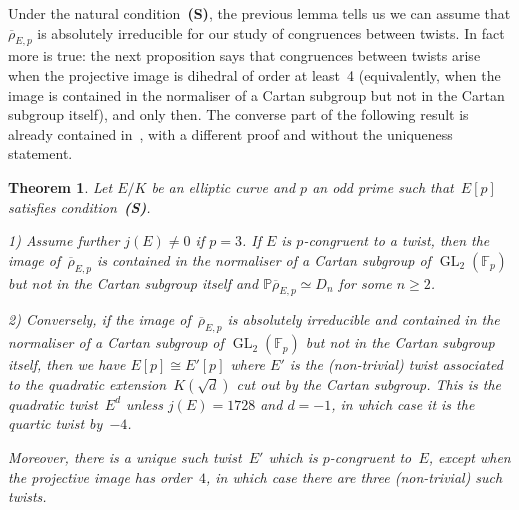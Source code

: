 \documentclass[12pt, reqno]{amsart}
\newcommand{\Fp}{\mathbb{F}_p}
\newcommand{\PP}{\mathbb{P}}
\newcommand{\rhobar}{{\overline{\rho}}}
\newcommand{\GL}{\operatorname{GL}}
\numberwithin{equation}{section}
\newtheorem{theorem}{Theorem}[section]
\theoremstyle{definition}
\theoremstyle{remark}
\newcommand{\condS}{condition~{\bf (S)}}
\begin{document}
Under the natural \condS, the previous lemma tells us we can assume
that $\rhobar_{E,p}$ is absolutely irreducible for our study of
congruences between twists. In fact more is true: the next proposition
says that congruences between twists arise when the projective image
is dihedral of order at least~4 (equivalently, when the image is
contained in the normaliser of a Cartan subgroup but not in the Cartan subgroup
itself), and only then.  The converse part of the following result is
already contained in~\cite[\S2]{Halberstadt-11nonsplit}, with a
different proof and without the uniqueness statement.

\begin{theorem}\label{T:twist}
Let $E/K$ be an elliptic curve and $p$ an odd prime such that~$E[p]$
satisfies \condS. 


1) Assume further $j(E) \neq 0$ if $p=3$. If $E$ is $p$-congruent to a twist, 
then the image of~$\rhobar_{E,p}$ is contained in the normaliser of a
Cartan subgroup of $\GL_2(\Fp)$ but not in the Cartan subgroup itself and
$\PP \rhobar_{E,p} \simeq D_n$ for some $n \geq 2$.

2) Conversely, if the image of~$\rhobar_{E,p}$ is absolutely irreducible and contained in the
normaliser of a Cartan subgroup of $\GL_2(\Fp)$ but not in the Cartan
subgroup itself, 
then we have $E[p]\cong E'[p]$ where $E'$ is the (non-trivial) twist associated to
the quadratic extension~$K(\sqrt{d})$ cut out by the Cartan subgroup.
This is the quadratic twist~$E^d$ unless $j(E)=1728$ and $d=-1$, in
which case it is the quartic twist by~$-4$.

Moreover, there is a unique such twist~$E'$ which is $p$-congruent to~$E$, except when the
projective image has order~$4$, in which case there are three (non-trivial) such
twists.
\end{theorem}
\end{document}
